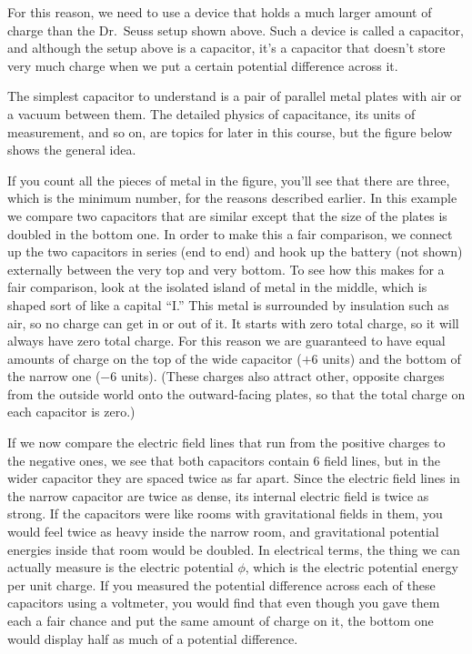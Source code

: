 For this reason, we need to use a device that holds a much larger amount
of charge than the Dr.~Seuss setup shown above. Such a device is called
a capacitor, and although the setup above is a capacitor, it's a capacitor
that doesn't store very much charge when we put a certain potential difference
across it.

The simplest capacitor to understand is a pair of parallel
metal plates with air or a vacuum between them. The detailed
physics of capacitance, its units of measurement, and so on, are topics
for later in this course, but the figure below shows the general idea.

\label{fig:em-fie-covid-capacitor-params}

If you count all the pieces of metal in the figure, you'll see that there are three,
which is the minimum number, for the reasons described earlier.
In this example we compare two capacitors that are similar
except that the size of the plates is doubled in the bottom one. In order to make this
a fair comparison, we connect up the two capacitors in series (end to end) and
hook up the battery (not shown) externally between the very top and
very bottom. To see how this makes for a fair comparison, look at the
isolated island of metal in the middle, which is shaped sort of like
a capital ``I.'' This metal is surrounded by insulation such as air,
so no charge can get in or out of it. It starts with zero total charge,
so it will always have zero total charge. For this reason we are
guaranteed to have equal amounts of charge on the top of
the wide capacitor ($+6$ units) and the bottom of the narrow one ($-6$ units).
(These charges also attract other, opposite charges from the outside world onto
the outward-facing plates, so that the total charge on each capacitor is
zero.)

If we now compare the electric field lines that run from the positive
charges to the negative ones, we see that both capacitors contain 6 field
lines, but in the wider capacitor they are spaced twice as far apart.
Since the electric field lines in the narrow capacitor are twice as dense,
its internal electric field is twice as strong. If the capacitors were
like rooms with gravitational fields in them, you would feel twice as
heavy inside the narrow room, and gravitational potential energies
inside that room would be doubled. In electrical terms, the thing we
can actually measure is the electric potential $\phi$, which is the
electric potential energy per unit charge. If you measured the potential
difference across each of these capacitors using a voltmeter, you would
find that even though you gave them each a fair chance and put the same
amount of charge on it, the bottom one would display half as much of a potential
difference.

